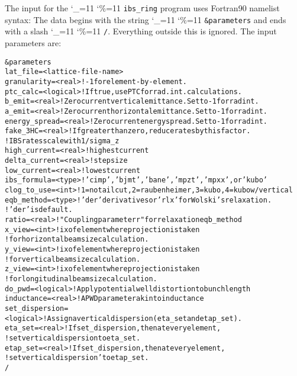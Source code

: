 \documentclass[11pt]{article}
\newcommand\ttcmd{\begingroup\catcode`\_=11 \catcode`\%=11 \dottcmd}
\newcommand\dottcmd[1]{\texttt{#1}\endgroup}
\newcommand{\vn}{\ttcmd}
\newlength{\ExBeg}
\newlength{\ExEnd}
\newenvironment{example}
  {\vspace{\ExBeg} \begin{alltt}}
  {\end{alltt} \vspace{\ExEnd}}
\begin{document}
The input for the \vn{ibs_ring} program uses Fortran90 namelist
syntax: The data begins with the string \vn{\&parameters} and ends
with a slash \vn{/}. Everything outside this is ignored.
The input parameters are:
\begin{example}
\&parameters
  lat_file = <lattice-file-name>
  granularity = <real>   ! -1 for element-by-element.
  ptc_calc = <logical>  ! If true, use PTC for rad. int. calculations.
  b_emit = <real>  ! Zero current vertical emittance.  Set to -1 for rad int.
  a_emit = <real>  ! Zero current horizontal emittance.  Set to -1 for rad int.
  energy_spread = <real>  !Zero current energy spread.  Set to -1 for rad int.
  fake_3HC = <real> ! If greater than zero, reduce rates by this factor.  
                    ! IBS rates scale with 1/sigma_z
  high_current = <real>  ! highest current
  delta_current = <real> ! step size
  low_current = <real>   ! lowest current
  ibs_formula = <type>  ! 'cimp', 'bjmt', 'bane', 'mpzt', 'mpxx', or 'kubo'
  clog_to_use = <int>   ! 1=no tail cut, 2=raubenheimer, 3=kubo, 4=kubo w/vertical
  eqb_method = <type>   ! 'der' derivatives or 'rlx' for Wolski's relaxation.  
                        ! 'der' is default.
  ratio = <real>  ! "Coupling parameter r" for relaxation eqb_method
  x_view = <int>  ! ix of element where projection is taken 
                  ! for horizontal beam size calculation.
  y_view = <int>  ! ix of element where projection is taken 
                  ! for vertical beam size calculation.
  z_view = <int>  ! ix of element where projection is taken 
                  ! for longitudinal beam size calculation.
  do_pwd = <logical>  ! Apply potential well distortion to bunch length
  inductance = <real>  ! A PWD parameter akin to inductance
  set_dispersion = <logical> ! Assign a vertical dispersion (eta_set and etap_set).
  eta_set = <real> ! If set_dispersion, then at every element, 
                   ! set vertical dispersion to eta_set.
  etap_set = <real> ! If set_dispersion, then at every element, 
                    ! set vertical dispersion' to etap_set.
/
\end{example}
\end{document}
